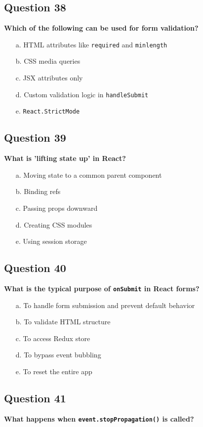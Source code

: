 \documentclass{article}
\begin{document}
\subsection*{Question 38}
\textbf{Which of the following can be used for form validation?}

\begin{itemize}
  \item[a.] HTML attributes like \texttt{required} and \texttt{minlength}
  \item[b.] CSS media queries
  \item[c.] JSX attributes only
  \item[d.] Custom validation logic in \texttt{handleSubmit}
  \item[e.] \texttt{React.StrictMode}
\end{itemize}

\subsection*{Question 39}
\textbf{What is 'lifting state up' in React?}

\begin{itemize}
  \item[a.] Moving state to a common parent component
  \item[b.] Binding refs
  \item[c.] Passing props downward
  \item[d.] Creating CSS modules
  \item[e.] Using session storage
\end{itemize}

\subsection*{Question 40}
\textbf{What is the typical purpose of \texttt{onSubmit} in React forms?}

\begin{itemize}
  \item[a.] To handle form submission and prevent default behavior
  \item[b.] To validate HTML structure
  \item[c.] To access Redux store
  \item[d.] To bypass event bubbling
  \item[e.] To reset the entire app
\end{itemize}

\subsection*{Question 41}
\textbf{What happens when \texttt{event.stopPropagation()} is called?}
\end{document}
